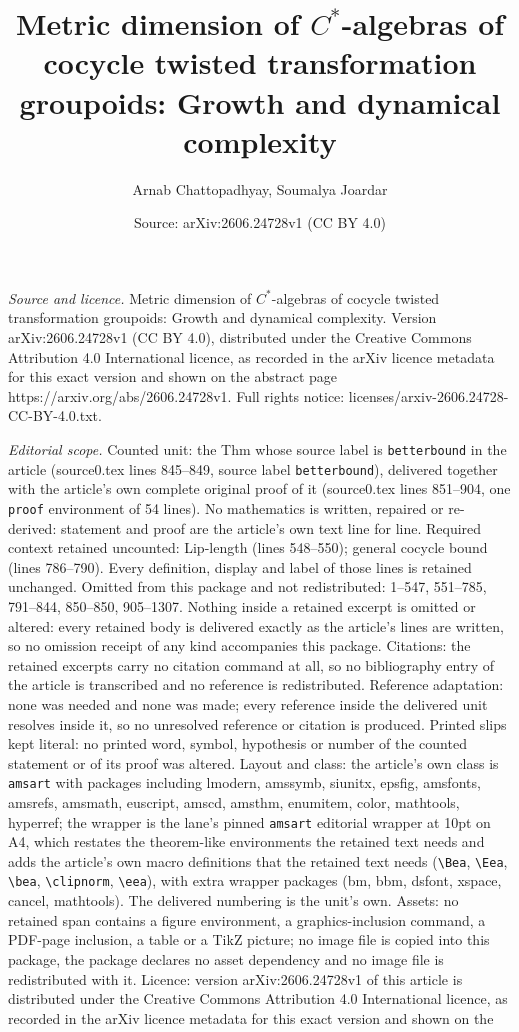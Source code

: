\documentclass[10pt,a4paper]{amsart}
\title[Metric dimension of $C^{\ast}$-algebras of cocycle twisted t]{Metric dimension of $C^{\ast}$-algebras of cocycle twisted transformation groupoids: Growth and dynamical complexity}
\author{Arnab Chattopadhyay, Soumalya Joardar}
\date{Source: arXiv:2606.24728v1 (CC BY 4.0)}
\begin{document}
\maketitle

\noindent\emph{Source and licence.} Metric dimension of $C^{\ast}$-algebras of cocycle twisted transformation groupoids: Growth and dynamical complexity. Version arXiv:2606.24728v1 (CC BY 4.0), distributed under the Creative Commons Attribution 4.0 International licence, as recorded in the arXiv licence metadata for this exact version and shown on the abstract page https://arxiv.org/abs/2606.24728v1. Full rights notice: licenses/arxiv-2606.24728-CC-BY-4.0.txt.\par\smallskip

\noindent\textit{Editorial scope.} Counted unit: the Thm whose source label is \texttt{betterbound} in the article (source0.tex lines 845--849, source label \texttt{betterbound}), delivered together with the article's own complete original proof of it (source0.tex lines 851--904, one \texttt{proof} environment of 54 lines). No mathematics is written, repaired or re-derived: statement and proof are the article's own text line for line. Required context retained uncounted: Lip-length (lines 548--550); general cocycle bound (lines 786--790). Every definition, display and label of those lines is retained unchanged. Omitted from this package and not redistributed: 1--547, 551--785, 791--844, 850--850, 905--1307. Nothing inside a retained excerpt is omitted or altered: every retained body is delivered exactly as the article's lines are written, so no omission receipt of any kind accompanies this package. Citations: the retained excerpts carry no citation command at all, so no bibliography entry of the article is transcribed and no reference is redistributed. Reference adaptation: none was needed and none was made; every reference inside the delivered unit resolves inside it, so no unresolved reference or citation is produced. Printed slips kept literal: no printed word, symbol, hypothesis or number of the counted statement or of its proof was altered. Layout and class: the article's own class is \texttt{amsart} with packages including lmodern, amssymb, siunitx, epsfig, amsfonts, amsrefs, amsmath, euscript, amscd, amsthm, enumitem, color, mathtools, hyperref; the wrapper is the lane's pinned \texttt{amsart} editorial wrapper at 10pt on A4, which restates the theorem-like environments the retained text needs and adds the article's own macro definitions that the retained text needs (\texttt{\textbackslash Bea}, \texttt{\textbackslash Eea}, \texttt{\textbackslash bea}, \texttt{\textbackslash clipnorm}, \texttt{\textbackslash eea}), with extra wrapper packages (bm, bbm, dsfont, xspace, cancel, mathtools). The delivered numbering is the unit's own. Assets: no retained span contains a figure environment, a graphics-inclusion command, a PDF-page inclusion, a table or a TikZ picture; no image file is copied into this package, the package declares no asset dependency and no image file is redistributed with it. Licence: version arXiv:2606.24728v1 of this article is distributed under the Creative Commons Attribution 4.0 International licence, as recorded in the arXiv licence metadata for this exact version and shown on the 
\end{document}
